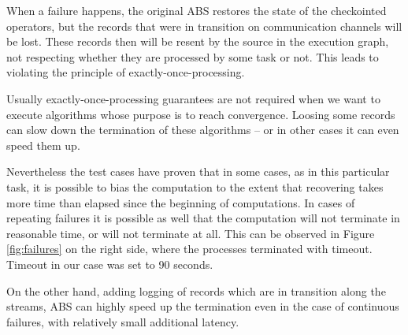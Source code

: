 When a failure happens, the original ABS restores the state of the checkointed operators, but the records that were in transition on communication channels will be lost. These records then will be resent by the source in the execution graph, not respecting whether they are processed by some task or not. This leads to violating the principle of exactly-once-processing.

Usually exactly-once-processing guarantees are not required when we want to execute algorithms whose purpose is to reach convergence. Loosing some records can slow down the termination of these algorithms -- or in other cases it can even speed them up. 

Nevertheless the test cases have proven that in some cases, as in this particular task, it is possible  to bias the computation to the extent that recovering takes more time than elapsed since the beginning of computations. In cases of repeating failures it is possible as well that the computation will not terminate in reasonable time, or will not terminate at all.  This can be observed in Figure \ref{fig:failures} on the right side, where the processes terminated with timeout. Timeout in our case was set to 90 seconds.  

On the other hand, adding logging of records which are in transition along the streams, ABS can highly speed up the termination even in the case of continuous failures, with relatively small additional latency. 



